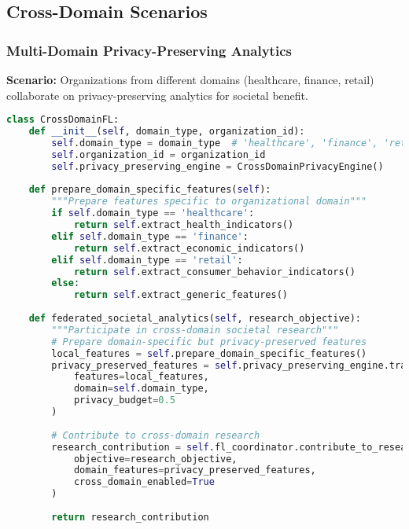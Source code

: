 \subsection{Cross-Domain Scenarios}

\subsubsection{Multi-Domain Privacy-Preserving Analytics}

\textbf{Scenario:} Organizations from different domains (healthcare, finance, retail) collaborate on privacy-preserving analytics for societal benefit.

\begin{lstlisting}[language=python, caption=Cross-Domain FL Implementation]
class CrossDomainFL:
    def __init__(self, domain_type, organization_id):
        self.domain_type = domain_type  # 'healthcare', 'finance', 'retail', etc.
        self.organization_id = organization_id
        self.privacy_preserving_engine = CrossDomainPrivacyEngine()
        
    def prepare_domain_specific_features(self):
        """Prepare features specific to organizational domain"""
        if self.domain_type == 'healthcare':
            return self.extract_health_indicators()
        elif self.domain_type == 'finance':
            return self.extract_economic_indicators()
        elif self.domain_type == 'retail':
            return self.extract_consumer_behavior_indicators()
        else:
            return self.extract_generic_features()
            
    def federated_societal_analytics(self, research_objective):
        """Participate in cross-domain societal research"""
        # Prepare domain-specific but privacy-preserved features
        local_features = self.prepare_domain_specific_features()
        privacy_preserved_features = self.privacy_preserving_engine.transform(
            features=local_features,
            domain=self.domain_type,
            privacy_budget=0.5
        )
        
        # Contribute to cross-domain research
        research_contribution = self.fl_coordinator.contribute_to_research(
            objective=research_objective,
            domain_features=privacy_preserved_features,
            cross_domain_enabled=True
        )
        
        return research_contribution
\end{lstlisting}

